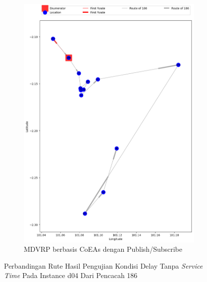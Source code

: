 \begin{figure}[H]\ContinuedFloat
	\centering
	\begin{subfigure}[t]{\textwidth}
		\centering
		\includegraphics[width=\textwidth]{Resources/Images/delayed_5/real_m15_n100_delayed_5_186_pubsub_coes}
		\caption{MDVRP berbasis CoEAs dengan Publish/Subscribe}
		\label{fig:real_m15_n100_delayed_5_186_pubsub_coes}
	\end{subfigure}
	\caption{Perbandingan Rute Hasil Pengujian Kondisi Delay Tanpa \textit{Service Time} Pada Instance d04 Dari Pencacah 186}
	\label{fig:real_m15_n100_delayed_5_186_contd}
\end{figure}


